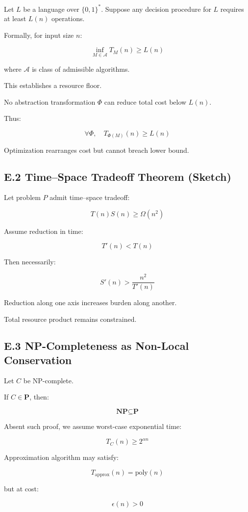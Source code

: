 \documentclass[11pt,openany]{book}
\begin{document}
Let $L$ be a language over $\{0,1\}^*$.
Suppose any decision procedure for $L$ requires at least $L(n)$ operations.

Formally, for input size $n$:

\[
\inf_{M \in \mathcal{A}} T_M(n) \ge L(n)
\]

where $\mathcal{A}$ is class of admissible algorithms.

This establishes a resource floor.

No abstraction transformation $\Phi$ can reduce total cost below $L(n)$.

Thus:

\[
\forall \Phi, \quad T_{\Phi(M)}(n) \ge L(n)
\]

Optimization rearranges cost but cannot breach lower bound.

\subsection{E.2 Time--Space Tradeoff Theorem (Sketch)}

Let problem $P$ admit time--space tradeoff:

\[
T(n) S(n) \ge \Omega(n^2)
\]

Assume reduction in time:

\[
T'(n) < T(n)
\]

Then necessarily:

\[
S'(n) > \frac{n^2}{T'(n)}
\]

Reduction along one axis increases burden along another.

Total resource product remains constrained.

\subsection{E.3 NP-Completeness as Non-Local Conservation}

Let $C$ be NP-complete.

If $C \in \textbf{P}$, then:

\[
\textbf{NP} \subseteq \textbf{P}
\]

Absent such proof, we assume worst-case exponential time:

\[
T_C(n) \ge 2^{\alpha n}
\]

Approximation algorithm may satisfy:

\[
T_{\text{approx}}(n) = \text{poly}(n)
\]

but at cost:

\[
\epsilon(n) > 0
\]
\end{document}
